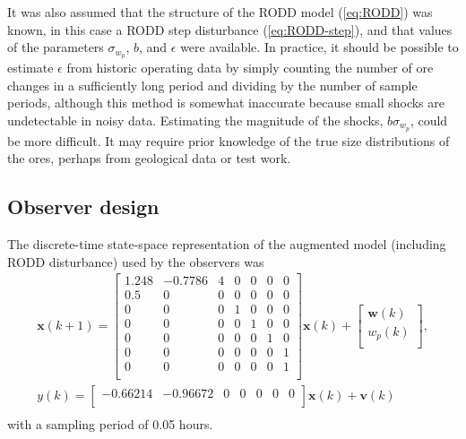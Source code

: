 It was also assumed that the structure of the \gls{RODD} model (\ref{eq:RODD}) was known, in this case a \gls{RODD} step disturbance (\ref{eq:RODD-step}), and that values of the parameters $\sigma_{w_p}$, $b$, and $\epsilon$ were available. In practice, it should be possible to estimate $\epsilon$ from historic operating data by simply counting the number of ore changes in a sufficiently long period and dividing by the number of sample periods, although this method is somewhat inaccurate because small shocks are undetectable in noisy data. Estimating the magnitude of the shocks, $b$$\sigma_{w_p}$, could be more difficult. It may require prior knowledge of the true size distributions of the ores, perhaps from geological data or test work.

\subsection{Observer design} \label{sec:grind1-obs-design}

The discrete-time state-space representation of the augmented model (including \gls{RODD} disturbance) used by the observers was
\begin{multline} \label{eq:grind1-obs_ss_model}
	\mathbf{x}(k+1) = 
	\begin{bmatrix}
		1.248 & -0.7786 & 4 & 0 & 0 & 0 & 0 \\
		0.5   &  0      & 0 & 0 & 0 & 0 & 0 \\
		0     &  0      & 0 & 1 & 0 & 0 & 0 \\
		0     &  0      & 0 & 0 & 1 & 0 & 0 \\
		0     &  0      & 0 & 0 & 0 & 1 & 0 \\
		0     &  0      & 0 & 0 & 0 & 0 & 1 \\
		0     &  0      & 0 & 0 & 0 & 0 & 1 \\
	\end{bmatrix} \mathbf{x}(k)
	+ \begin{bmatrix}
		\mathbf{w}(k) \\
		w_p(k) \\
	\end{bmatrix}, \\
	y(k) = 
	\begin{bmatrix}
		-0.66214 & -0.96672 & 0 & 0 & 0 & 0 & 0 \\
	\end{bmatrix} \mathbf{x}(k) + \mathbf{v}(k) \\
\end{multline}
with a sampling period of 0.05 hours.

